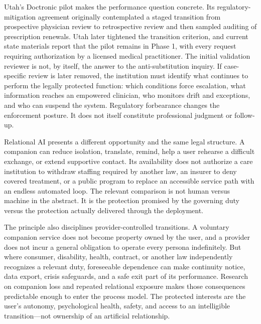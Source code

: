 Utah's Doctronic pilot makes the performance question concrete. Its regulatory-mitigation agreement originally contemplated a staged transition from prospective physician review to retrospective review and then sampled auditing of prescription renewals. Utah later tightened the transition criterion, and current state materials report that the pilot remains in Phase 1, with every request requiring authorization by a licensed medical practitioner. The initial validation reviewer is not, by itself, the answer to the anti-substitution inquiry. If case-specific review is later removed, the institution must identify what continues to perform the legally protected function: which conditions force escalation, what information reaches an empowered clinician, who monitors drift and exceptions, and who can suspend the system. Regulatory forbearance changes the enforcement posture. It does not itself constitute professional judgment or follow-up.

Relational AI presents a different opportunity and the same legal structure. A companion can reduce isolation, translate, remind, help a user rehearse a difficult exchange, or extend supportive contact. Its availability does not authorize a care institution to withdraw staffing required by another law, an insurer to deny covered treatment, or a public program to replace an accessible service path with an endless automated loop. The relevant comparison is not human versus machine in the abstract. It is the protection promised by the governing duty versus the protection actually delivered through the deployment.

The principle also disciplines provider-controlled transitions. A voluntary companion service does not become property owned by the user, and a provider does not incur a general obligation to operate every persona indefinitely. But where consumer, disability, health, contract, or another law independently recognizes a relevant duty, foreseeable dependence can make continuity notice, data export, crisis safeguards, and a safe exit part of its performance. Research on companion loss and repeated relational exposure makes those consequences predictable enough to enter the process model. The protected interests are the user's autonomy, psychological health, safety, and access to an intelligible transition---not ownership of an artificial relationship.

